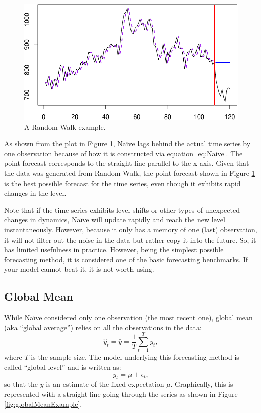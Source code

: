 \documentclass[
]{book}
\theoremstyle{definition}
\theoremstyle{definition}
\theoremstyle{definition}
\theoremstyle{definition}
\theoremstyle{remark}
\begin{document}
\begin{figure}
\centering
\includegraphics{Svetunkov--2022----ADAM_files/figure-latex/naiveExample-1.pdf}
\caption{\label{fig:naiveExample}A Random Walk example.}
\end{figure}

As shown from the plot in Figure \ref{fig:naiveExample}, Naïve lags behind the actual time series by one observation because of how it is constructed via equation \eqref{eq:Naive}. The point forecast corresponds to the straight line parallel to the x-axis. Given that the data was generated from Random Walk, the point forecast shown in Figure \ref{fig:naiveExample} is the best possible forecast for the time series, even though it exhibits rapid changes in the level.

Note that if the time series exhibits level shifts or other types of unexpected changes in dynamics, Naïve will update rapidly and reach the new level instantaneously. However, because it only has a memory of one (last) observation, it will not filter out the noise in the data but rather copy it into the future. So, it has limited usefulness in practice. However, being the simplest possible forecasting method, it is considered one of the basic forecasting benchmarks. If your model cannot beat it, it is not worth using.

\hypertarget{GlobalMean}{%
\subsection{Global Mean}\label{GlobalMean}}

While Naïve considered only one observation (the most recent one), global mean (aka ``global average'') relies on all the observations in the data:
\begin{equation}
    \hat{y}_t = \bar{y} = \frac{1}{T} \sum_{t=1}^T y_{t} ,
    \label{eq:GlobalMean}
\end{equation}
where \(T\) is the sample size. The model underlying this forecasting method is called ``global level'' and is written as:
\begin{equation}
    y_t = \mu + \epsilon_t,
    \label{eq:GlobalLevel}
\end{equation}
so that the \(\bar{y}\) is an estimate of the fixed expectation \(\mu\). Graphically, this is represented with a straight line going through the series as shown in Figure \ref{fig:globalMeanExample}.
\end{document}
